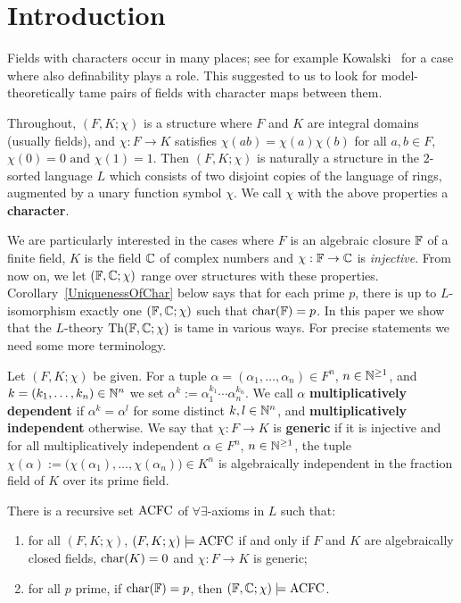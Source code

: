 \section{Introduction}

\noindent 
Fields with characters occur in many places; see for example 
Kowalski~\cite{Kowalski} for a case where also definability plays a role.
This suggested to us to
look for model-theoretically tame pairs of fields with character maps 
between them.  

Throughout, $(F, K; \chi)$ is a structure where $F$ and $K$ are integral 
domains (usually fields), and $\chi: F \to K$ satisfies 
$\chi(ab)=\chi(a)\chi(b)$ for all $a,b\in F $, $\chi(0)=0 \text{ and } \chi(1)=1.$
Then $(F, K; \chi)$ is naturally a structure in  the $2$-sorted language $L$ which consists of two disjoint copies of the language of rings, augmented by a unary function symbol $\chi$. We call $\chi$ with the above properties a \textbf{character}.


We are particularly interested in the cases where $F$ is an algebraic closure $\mathbb{F}$ of a finite field, $K$ is the field $\mathbb{C}$ of complex numbers and $\chi: \mathbb{F} \to \mathbb{C}$ is {\em injective}. 
From now on, we let $(\mathbb{F}, \mathbb{C}; \chi)$ range over structures with these properties.
Corollary~\ref{UniquenessOfChar} below says 
that for each prime $p$, there is up to $L$-isomorphism exactly one  $(\mathbb{F}, \mathbb{C}; \chi)$
such that $\mathrm{char}(\mathbb{F}) = p$. 
In this paper we show that the 
$L$-theory $\text{Th}(\mathbb{F}, \mathbb{C}; \chi)$ is tame in various ways. For precise statements we
need some more terminology. 

Let $(F,K;\chi)$ be given. For a tuple $\alpha=(\alpha_1,\dots, \alpha_n)\in F^n$, $n \in \mathbb{N}^{\geq 1}$, and $k=(k_1,\dots,k_n)\in \mathbb{N}^n$ we set $\alpha^k:=\alpha_1^{k_1}\cdots\alpha_n^{k_n}$. We call $\alpha$ {\bf multiplicatively dependent}
if $\alpha^k=\alpha^l$ for some distinct $k,l\in \mathbb{N}^n$, and {\bf multiplicatively independent} otherwise.
We say that \( \chi: F \to K\) is { \bf generic} if it is injective and 
for all multiplicatively independent $\alpha \in F^n$, $n \in \mathbb{N}^{\geq 1}$,
the tuple $\chi(\alpha):=\big(\chi(\alpha_1),\dots, \chi(\alpha_n)\big) \in K^n$ is algebraically independent in the fraction field of $K$ over its prime field.

\begin{thm}
There is a recursive set $\mathrm{ACFC}$ of $\forall\exists$-axioms in $L$ such that:
\begin{enumerate}
\item for all $(F, K;\chi)$, $(F, K;\chi)\models \mathrm{ACFC}$ if and only if $F$ and $K$ are algebraically closed fields, $\mathrm{char}(K)=0$ and $\chi:F \to K$ is generic;
\item for all $p$ prime, if $\mathrm{char}(\mathbb{F})=p$, then $(\mathbb{F}, \mathbb{C}; \chi)\models \mathrm{ACFC}$.
\end{enumerate}
\end{thm}


